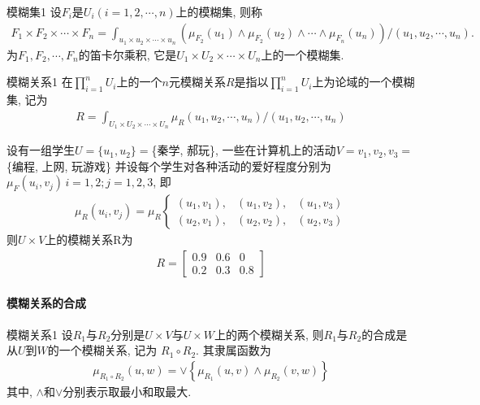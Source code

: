 \begin{mydef}{模糊集}{1}
设$F_i$是$U_i(i=1,2,\cdots,n)$上的模糊集, 则称
 \begin{align}
   F_{1} \times F_{2} \times \cdots \times F_{n}=
    \int_{u_{1} \times u_{2} \times \cdots \times u_{n}}\left(\mu_{F_{2}}(u_{1}) \wedge \mu_{F_{2}}\left(u_{2}\right)
    \wedge \cdots \wedge \mu_{F_{n}}\left(u_{n}\right)\right) /\left(u_{1}, u_{2}, \cdots, u_{n}\right).
 \end{align}
为$F_1,F_2,\cdots,F_n$的笛卡尔乘积, 它是$U_1\times U_2\times\cdots\times U_n$上的一个模糊集.
\end{mydef}
\begin{mydef}{模糊关系}{1}
在$\prod_{i=1}^n U_i$上的一个$n$元模糊关系$R$是指以$\prod_{i=1}^n U_i$上为论域的一个模糊集, 记为
\begin{align}
  R=\int_{U_1\times U_2\times\cdots\times U_n} \mu_{R}\left(u_{1}, u_{2}, \cdots, u_{n}\right) /\left(u_{1}, u_{2}, \cdots, u_{n}\right)
\end{align}
\end{mydef}

\begin{example}
设有一组学生$U=\{u_1,u_2\}=$\{秦学, 郝玩\}, 一些在计算机上的活动$V={v_1,v_2,v_3}=$\{编程, 上网, 玩游戏\}
并设每个学生对各种活动的爱好程度分别为 $\mu_{F}\left(u_{i}, v_{j}\right)\, i=1,2; j=1,2,3$, 即
\begin{align}
  \mu_{R}(u_i,v_j)=
  \mu_{R}
  \left\{
  \begin{array}{llll}
    (u_1,v_1),&(u_1,v_2),&(u_1,v_3)\\
    (u_2,v_1),&(u_2,v_2),&(u_2,v_3)
  \end{array}
  \right.
\end{align}
则$U\times V$上的模糊关系R为
\begin{align}
  R=\left[\begin{array}{lll}{0.9} & {0.6} & {0} \\ {0.2} & {0.3} & {0.8}\end{array}\right]
\end{align}
\end{example}
\paragraph{模糊关系的合成}
\begin{mydef}{模糊关系}{1}
设$R_1$与$R_2$分别是$U\times V$与$U\times W$上的两个模糊关系, 则$R_1$与$R_2$的合成是从$U$到$W$的一个模糊关系, 记为   $R_1\circ R_2$. 其隶属函数为
\begin{align}
  \mu_{R_{1}\circ R_{2}}(u, w)=\vee\left\{\mu_{R_{1}}(u, v) \wedge \mu_{R_{2}}(v, w)\right\}
\end{align}
其中, $\wedge$和$\vee$分别表示取最小和取最大.
\end{mydef}

